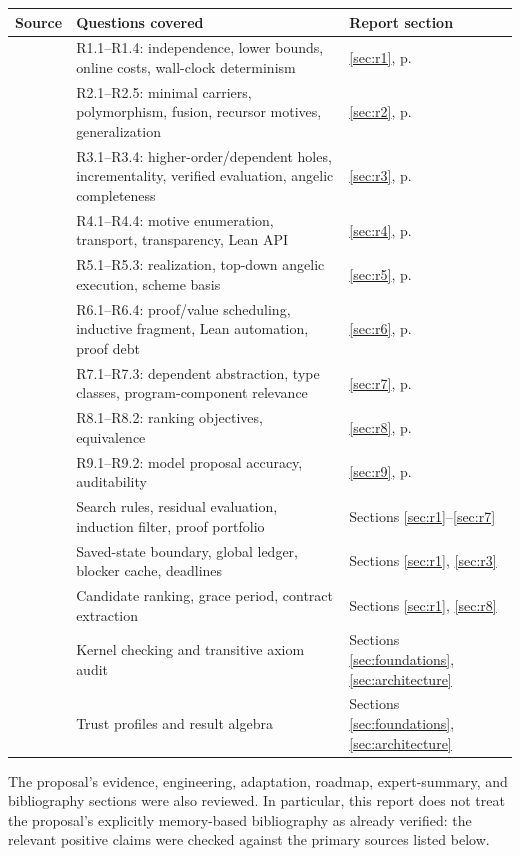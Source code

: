\documentclass[11pt,a4paper]{article}
\theoremstyle{definition}
\theoremstyle{remark}
\begin{document}
\begin{longtable}{@{}L{39mm}L{64mm}L{45mm}@{}}
\toprule
Source & Questions covered & Report section\\
\midrule\endhead
{} & R1.1--R1.4: independence, lower bounds, online costs,
wall-clock determinism & \ref{sec:r1}, p.~\pageref{sec:r1}\\
 & R2.1--R2.5: minimal carriers, polymorphism, fusion,
recursor motives, generalization & \ref{sec:r2}, p.~\pageref{sec:r2}\\
 & R3.1--R3.4: higher-order/dependent holes,
incrementality, verified evaluation, angelic completeness & \ref{sec:r3},
p.~\pageref{sec:r3}\\
 & R4.1--R4.4: motive enumeration, transport,
transparency, Lean API & \ref{sec:r4}, p.~\pageref{sec:r4}\\
 & R5.1--R5.3: realization, top-down angelic execution,
scheme basis & \ref{sec:r5}, p.~\pageref{sec:r5}\\
 & R6.1--R6.4: proof/value scheduling, inductive fragment,
Lean automation, proof debt & \ref{sec:r6}, p.~\pageref{sec:r6}\\
 & R7.1--R7.3: dependent abstraction, type classes,
program-component relevance & \ref{sec:r7}, p.~\pageref{sec:r7}\\
 & R8.1--R8.2: ranking objectives, equivalence &
\ref{sec:r8}, p.~\pageref{sec:r8}\\
 & R9.1--R9.2: model proposal accuracy, auditability &
\ref{sec:r9}, p.~\pageref{sec:r9}\\
\midrule
{} & Search rules, residual evaluation, induction
filter, proof portfolio & Sections \ref{sec:r1}--\ref{sec:r7}\\
 & Saved-state boundary, global ledger,
blocker cache, deadlines & Sections \ref{sec:r1}, \ref{sec:r3}\\
 & Candidate ranking, grace period, contract extraction &
Sections \ref{sec:r1}, \ref{sec:r8}\\
 & Kernel checking and transitive axiom audit &
Sections \ref{sec:foundations}, \ref{sec:architecture}\\
 & Trust profiles and result algebra &
Sections \ref{sec:foundations}, \ref{sec:architecture}\\
\bottomrule
\end{longtable}
The proposal's evidence, engineering, adaptation, roadmap, expert-summary, and
bibliography sections were also reviewed. In particular, this report does not treat the proposal's
explicitly memory-based bibliography as already verified: the relevant positive
claims were checked against the primary sources listed below.
\end{document}
